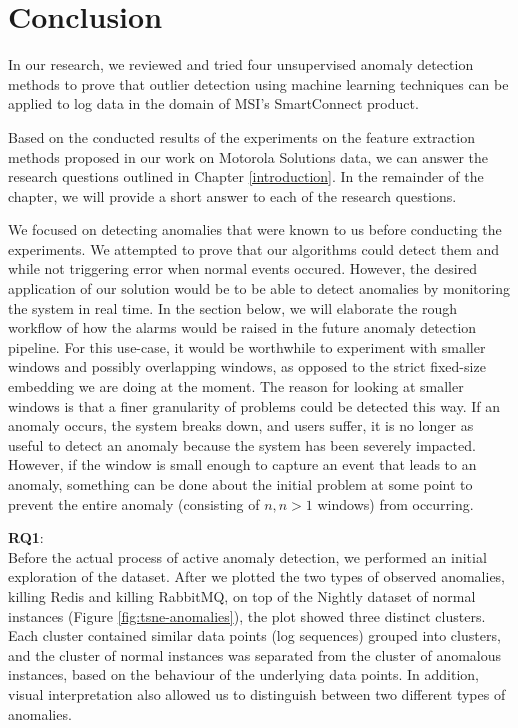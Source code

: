 \section{Conclusion}

In our research, we reviewed and tried four unsupervised anomaly detection methods to prove that outlier detection using machine learning techniques can be applied to log data in the domain of MSI's SmartConnect product.

Based on the conducted results of the experiments on the feature extraction methods proposed in our work on Motorola Solutions data, we can answer the research questions outlined in Chapter \ref{introduction}. In the remainder of the chapter, we will provide a short answer to each of the research questions.

We focused on detecting anomalies that were known to us before conducting the experiments. We attempted to prove that our algorithms could detect them and while not triggering error when normal events occured. However, the desired application of our solution would be to be able to detect anomalies by monitoring the system in real time. In the section below, we will elaborate the rough workflow of how the alarms would be raised in the future anomaly detection pipeline. For this use-case, it would be worthwhile to experiment with smaller windows and possibly overlapping windows, as opposed to the strict fixed-size embedding we are doing at the moment. The reason for looking at smaller windows is that a finer granularity of problems could be detected this way. If an anomaly occurs, the system breaks down, and users suffer, it is no longer as useful to detect an anomaly because the system has been severely impacted. However, if the window is small enough to capture an event that leads to an anomaly, something can be done about the initial problem at some point to prevent the entire anomaly (consisting of $n, n > 1$ windows) from occurring.

\textbf{RQ1}: \textit{\RQFirst}\\

Before the actual process of active anomaly detection, we performed an initial exploration of the dataset. After we plotted the two types of observed anomalies, killing Redis and killing RabbitMQ, on top of the Nightly dataset of normal instances (Figure \ref{fig:tsne-anomalies}), the plot showed three distinct clusters. Each cluster contained similar data points (log sequences) grouped into clusters, and the cluster of normal instances was separated from the cluster of anomalous instances, based on the behaviour of the underlying data points. In addition, visual interpretation also allowed us to distinguish between two different types of anomalies.

